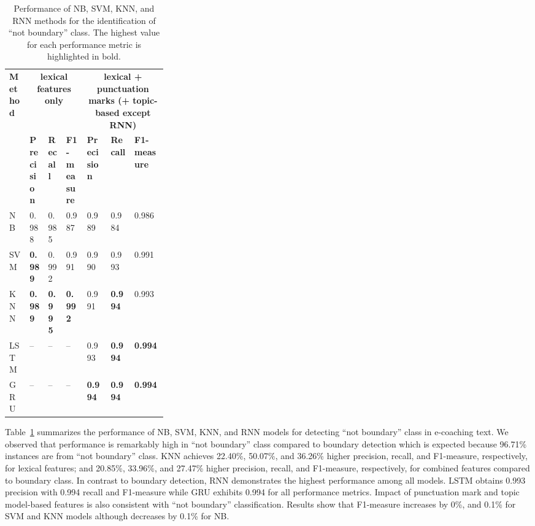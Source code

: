 \documentclass{amia}
\begin{document}
\begin{table}[ht]
\centering
\caption{Performance of NB, SVM, KNN, and RNN methods for the identification of ``not boundary'' class. The highest value for each performance metric is highlighted in bold.}
\label{tab:result_not_boundary}
  \begin{tabular}{|l|l|l|l|p{0.15\linewidth}|p{0.15\linewidth}|l|}
  \hline
   \multirow{2}{*}{\textbf{Method}} & \multicolumn{3}{|c|}{\textbf{lexical features only}} & \multicolumn{3}{|c|}{\textbf{lexical + punctuation marks (+ topic-based except RNN)}} \\\cline{2-7}
   & \textbf{Precision}  & \textbf{Recall} & \textbf{F1-measure} & \textbf{Precision}  & \textbf{Recall} & \textbf{F1-measure}\\ \hline    
    
 NB & 0.988 & 0.985 & 0.987 & 0.989 & 0.984 & 0.986 \\ \hline
 SVM & \textbf{0.989} & 0.992 & 0.991 & 0.990 & 0.993 & 0.991\\ \hline
 KNN & \textbf{0.989} & \textbf{0.995} & \textbf{0.992} & 0.991 & \textbf{0.994} & 0.993\\ \hline
 LSTM & -- & -- & -- & 0.993 & \textbf{0.994} & \textbf{0.994} \\ \hline
 GRU & -- & -- & -- & \textbf{0.994} & \textbf{0.994} & \textbf{0.994} \\ \hline 
  \end{tabular}
\end{table}

Table~\ref{tab:result_not_boundary} summarizes the performance of NB, SVM, KNN, and RNN models for detecting ``not boundary'' class in e-coaching text. We observed that performance is remarkably high in ``not boundary'' class compared to boundary detection which is expected because 96.71\% instances are from ``not boundary'' class. KNN achieves 22.40\%, 50.07\%, and 36.26\% higher precision, recall, and F1-measure, respectively, for lexical features; and 20.85\%, 33.96\%, and 27.47\% higher precision, recall, and F1-measure, respectively, for combined features compared to boundary class. In contrast to boundary detection, RNN demonstrates the highest performance among all models. LSTM obtains 0.993 precision with 0.994 recall and F1-measure while GRU exhibits 0.994 for all performance metrics. Impact of punctuation mark and topic model-based features is also consistent with ``not boundary'' classification. Results show that F1-measure increases by 0\%, and 0.1\% for SVM and KNN models although decreases by 0.1\% for NB. \\
\end{document}
